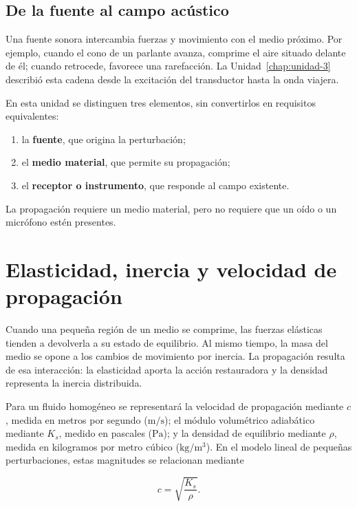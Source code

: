 \subsection{De la fuente al campo acústico}
\label{sec:u4-generacion}

Una fuente sonora intercambia fuerzas y movimiento con el medio próximo. Por
ejemplo, cuando el cono de un parlante avanza, comprime el aire situado delante
de él; cuando retrocede, favorece una rarefacción. La Unidad~\ref{chap:unidad-3}
describió esta cadena desde la excitación del transductor hasta la onda
viajera.

En esta unidad se distinguen tres elementos, sin convertirlos en requisitos
equivalentes:

\begin{enumerate}
    \item la \textbf{fuente}, que origina la perturbación;
    \item el \textbf{medio material}, que permite su propagación;
    \item el \textbf{receptor o instrumento}, que responde al campo existente.
\end{enumerate}

La propagación requiere un medio material, pero no requiere que un oído o un
micrófono estén presentes.

\section{Elasticidad, inercia y velocidad de propagación}
\label{sec:u4-elasticidad-velocidad}

Cuando una pequeña región de un medio se comprime, las fuerzas elásticas
tienden a devolverla a su estado de equilibrio. Al mismo tiempo, la masa del
medio se opone a los cambios de movimiento por inercia. La propagación resulta
de esa interacción: la elasticidad aporta la acción restauradora y la densidad
representa la inercia distribuida.

Para un fluido homogéneo se representará la velocidad de propagación mediante
\(c\), medida en metros por segundo (\(\text{m}/\text{s}\)); el módulo
volumétrico adiabático mediante \(K_s\), medido en pascales (\(\text{Pa}\)); y
la densidad de equilibrio mediante \(\rho\), medida en kilogramos por metro
cúbico (\(\text{kg}/\text{m}^3\)). En el modelo lineal de pequeñas
perturbaciones, estas magnitudes se relacionan mediante~\cite{xiangBlauert2021}

\begin{equation}
    c=\sqrt{\frac{K_s}{\rho}}.
    \label{eq:u4-velocidad-fluido}
\end{equation}

